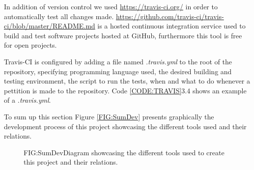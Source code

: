 In addition of version control we used \href{Travis-CI}{https://travis-ci.org/} in order to automatically test all changes made. \href{Travis CI}{https://github.com/travis-ci/travis-ci/blob/master/README.md} is a hosted continuous integration service used to build and test software projects hosted at GitHub, furthermore this tool is free for open projects.

Travis-CI is configured by adding a file named \textit{.travis.yml} to the root of the repository, specifying programming language used, the desired building and testing environment, the script to run the tests, when and what to do whenever a pettition is made to the repository. Code \ref{CODE:TRAVIS}3.4 shows an example of a \textit{.travis.yml}.

\label{CODE:TRAVIS}


To sum up this section Figure \ref{FIG:SumDev} presents graphically the development process of this project showcasing the different tools used and their relations.

\begin{figure}[Summary of the development process]{FIG:SumDev}{Diagram showcasing the different tools used to create this project and their relations.}
\end{figure}